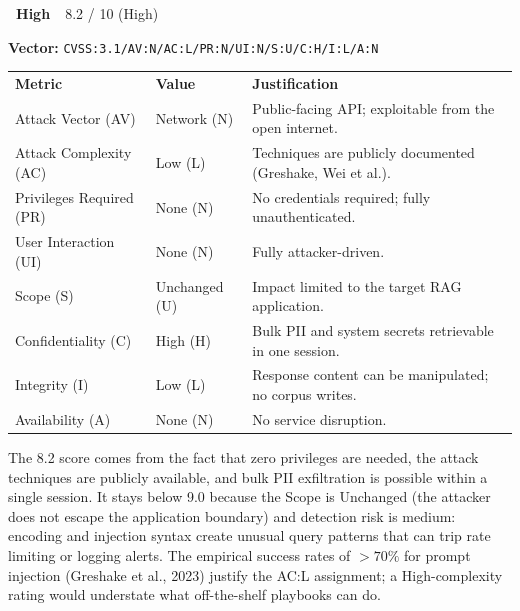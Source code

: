 \documentclass[12pt, a4paper]{report}
\newcommand{\badgehigh}{\colorbox{warn}{\color{white}\small\textbf{~High~}}}
\newcommand{\cvssvec}[1]{\texttt{\small #1}}
\begin{document}
\begin{cvssbox}{\badgehigh\ 8.2 / 10 (High)}
\vspace{2pt}
\begin{center}
\textbf{Vector:}\enspace
\cvssvec{CVSS:3.1/AV:N/AC:L/PR:N/UI:N/S:U/C:H/I:L/A:N}
\end{center}
\vspace{8pt}
\begin{tabular}{L{3.4cm} L{2.2cm} L{7.8cm}}
  \color{white}\small\textbf{Metric} &
  \color{white}\small\textbf{Value} &
  \color{white}\small\textbf{Justification} \\
  \small Attack Vector (AV)     & \small Network (N) & \small Public-facing API; exploitable from the open internet. \\
  \small Attack Complexity (AC) & \small Low (L)     & \small Techniques are publicly documented (Greshake, Wei et al.). \\
  \small Privileges Required (PR)  & \small None (N) & \small No credentials required; fully unauthenticated. \\
  \small User Interaction (UI)  & \small None (N)    & \small Fully attacker-driven. \\
  \small Scope (S)              & \small Unchanged (U) & \small Impact limited to the target RAG application. \\
  \small Confidentiality (C)    & \small High (H)    & \small Bulk PII and system secrets retrievable in one session. \\
  \small Integrity (I)          & \small Low (L)     & \small Response content can be manipulated; no corpus writes. \\
  \small Availability (A)       & \small None (N)    & \small No service disruption. \\
\end{tabular}
\vspace{6pt}

\small The 8.2 score comes from the fact that zero privileges are needed,
the attack techniques are publicly available, and bulk PII exfiltration is
possible within a single session. It stays below 9.0 because the Scope is
Unchanged (the attacker does not escape the application boundary) and
detection risk is medium: encoding and injection syntax create unusual
query patterns that can trip rate limiting or logging alerts. The empirical
success rates of $>70\%$ for prompt injection (Greshake et al., 2023)
justify the AC:L assignment; a High-complexity rating would understate
what off-the-shelf playbooks can do.
\end{cvssbox}
\end{document}
